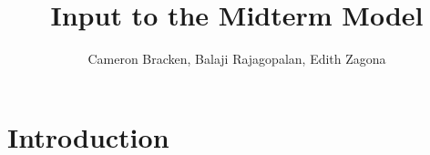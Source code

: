 \documentclass[final,5p,times,twocolumn,authoryear]{elsarticle}
\begin{document}
\begin{frontmatter}



\title{Input to the Midterm Model}


\author{Cameron Bracken, Balaji Rajagopalan, Edith Zagona}

\address{}

\begin{abstract}

\end{abstract}

\begin{keyword}


\end{keyword}

\end{frontmatter}




\section{Introduction}
\end{document}
